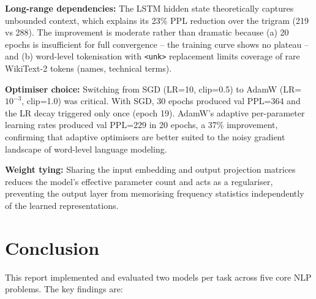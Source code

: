 \documentclass[11pt,a4paper]{article}
\begin{document}
\textbf{Long-range dependencies:} The LSTM hidden state theoretically captures unbounded context, which explains its 23\% PPL reduction over the trigram (219 vs 288). The improvement is moderate rather than dramatic because (a) 20 epochs is insufficient for full convergence -- the training curve shows no plateau -- and (b) word-level tokenisation with \texttt{<unk>} replacement limits coverage of rare WikiText-2 tokens (names, technical terms).

\textbf{Optimiser choice:} Switching from SGD (LR=10, clip=0.5) to AdamW (LR=$10^{-3}$, clip=1.0) was critical. With SGD, 30 epochs produced val PPL=364 and the LR decay triggered only once (epoch 19). AdamW's adaptive per-parameter learning rates produced val PPL=229 in 20 epochs, a 37\% improvement, confirming that adaptive optimisers are better suited to the noisy gradient landscape of word-level language modeling.

\textbf{Weight tying:} Sharing the input embedding and output projection matrices reduces the model's effective parameter count and acts as a regulariser, preventing the output layer from memorising frequency statistics independently of the learned representations.

\section{Conclusion}

This report implemented and evaluated two models per task across five core NLP problems. The key findings are:
\end{document}
